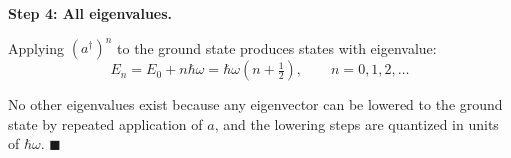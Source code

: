 \documentclass[12pt]{article}
\begin{document}
\textbf{Step 4: All eigenvalues.}

Applying $(a^\dagger)^n$ to the ground state produces states with eigenvalue:
\[
E_n = E_0 + n\hbar\omega = \hbar\omega\left(n + \tfrac{1}{2}\right), \qquad n = 0, 1, 2, \ldots
\]

No other eigenvalues exist because any eigenvector can be lowered to the ground state by repeated application of $a$, and the lowering steps are quantized in units of $\hbar\omega$. \hfill $\blacksquare$
\end{document}
